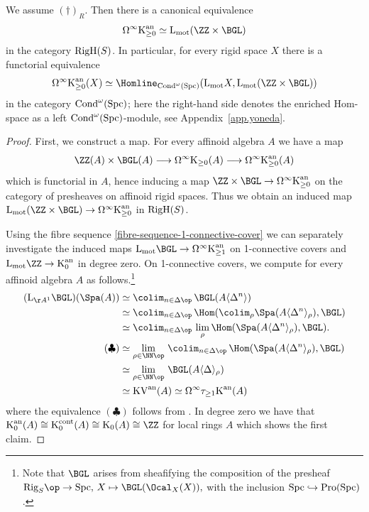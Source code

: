 \documentclass[colorinlistoftodos,article,11pt,reqno]{article}
\newcommand{\hlcan}[1]{{\sethlcolor{green}\hl{#1}}\sethlcolor{yellow}}
\newcommand{\RigH}{\textup{RigH}}
\newcommand{\Rig}{\textup{Rig}}
\newcommand{\Pro}{\textup{Pro}}
\newcommand{\Cond}{\textup{Cond}}
\newcommand{\Spc}{\textup{Spc}}
\newcommand{\K}{\textup{K}}
\newcommand{\Kan}{\K^\textup{an}}
\newcommand{\Kcont}{\K^\textup{cont}}
\newcommand{\KVan}{\textup{KV}^\textup{an}}
\newcommand{\Arig}{\AA^{1}}
\newcommand{\skp}[1]{\langle #1 \rangle}
\renewcommand{\to}[1][]{\overset{#1}{\rightarrow}}
\newcommand{\To}[1][]{\overset{#1}{\longrightarrow}}
\newcommand{\inj}[1][]{\overset{#1}{\hookrightarrow}}		%
\renewcommand{\L}{\textup{L}}
\newcommand{\Lmot}{\L_{\textup{mot}}}
\begin{document}
\begin{thm}[Representability]
\label{thm:representability}
We assume $(\dagger)_R$.
Then there is a canonical equivalence
\[ \Omega^\infty\Kan_{\geq 0} \simeq \Lmot(\ZZ\times\BGL) \]
in the category $\RigH(S)$.
In particular, for every rigid space $X$ there is a functorial equivalence
\[ \Omega^\infty\Kan_{\geq 0}(X) \simeq \Homline_{\Cond^\omega(\Spc)}(\Lmot X,\Lmot(\ZZ\times\BGL)) \]
in the category $\Cond^\omega(\Spc)$; here the right-hand side denotes the enriched Hom-space as a left $\Cond^\omega(\Spc)$-module, see Appendix~\ref{app.yoneda}.
\end{thm}
\begin{proof}
First, we construct a map. For every affinoid algebra $A$ we have a map 
\[ \ZZ(A)\times\BGL(A) \To \Omega^\infty\K_{\geq 0}(A) \To \Omega^\infty\Kan_{\geq 0}(A) \]
which is functorial in $A$, hence inducing a map $\ZZ\times\BGL\to\Omega^\infty\Kan_{\geq 0}$ on the category of presheaves on affinoid rigid spaces. Thus we obtain an induced map $\Lmot(\ZZ\times\BGL) \to \Omega^\infty\Kan_{\geq 0}$ in $\RigH(S)$. 

Using the fibre sequence \eqref{fibre-sequence-1-connective-cover} we can separately investigate the induced maps $\Lmot\BGL\to\Omega^\infty\Kan_{\geq 1}$ on 1-connective covers and $\Lmot\ZZ\to\Kan_0$ in degree zero. On 1-connective covers, we compute for every affinoid algebra $A$ as follows.\footnote{Note that $\BGL$ arises from sheafifying the composition of the presheaf $\Rig_S\op \to \Spc,\,X\mapsto\BGL(\Ocal_X(X)),$ with the inclusion $\Spc\inj\Pro(\Spc)$.}
\begin{align*}
(\L_{\Arig}\BGL)(\Spa(A)) &\simeq \colim_{n\in\Delta\op}\, \BGL(A\skp{\Delta^n})\\
&\simeq \colim_{n\in\Delta\op}\, \Hom(\colim_\rho \Spa(A\skp{\Delta^n}_\rho),\BGL)\\
&\simeq \colim_{n\in\Delta\op}\, \lim_\rho \Hom(\Spa(A\skp{\Delta^n}_\rho),\BGL).\\
(\clubsuit) &\simeq \lim_{\rho\in\NN\op}\, \colim_{n\in\Delta\op}\, \Hom(\Spa(A\skp{\Delta^n}_\rho),\BGL)\\
&\simeq \lim_{\rho\in\NN\op}\, \BGL(A\skp{\Delta}_\rho) \\
&\simeq \KVan(A) \simeq \Omega^\infty\tau_{\geq 1}\Kan(A)
\end{align*}
where the equivalence $(\clubsuit)$ follows from \cite[Lemma 2.8]{kst-ii}.
In degree zero we have that $\Kan_0(A) \cong \Kcont_0(A) \cong \K_0(A) \cong \ZZ$ for local rings $A$ which shows the first claim.


\end{proof}
\end{document}
